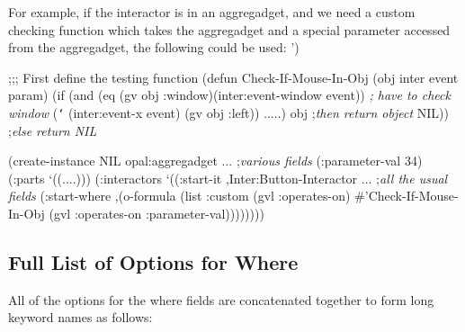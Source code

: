 For example, if the interactor is in an aggregadget, and we need a
custom checking function which takes the aggregadget and a special parameter
accessed from the aggregadget, the following could be used:
')
\begin{programexample}

;;; First define the testing function
(defun Check-If-Mouse-In-Obj (obj inter event param)
  (if (and (eq (gv obj :window)(inter:event-window event))   {\it ; have to check window}
	   ({\tt\char`\>} (inter:event-x event) (gv obj :left))
	   .....)
      obj  ;{\it then return object}
      NIL))  ;{\it else return NIL}

(create-instance NIL opal:aggregadget
   ... ;{\it various fields}
  (:parameter-val 34)
  (:parts `((....)))
  (:interactors
   `((:start-it ,Inter:Button-Interactor
	 ... ;{\it all the usual fields}
	 (:start-where
	  ,(o-formula (list :custom (gvl :operates-on)
			    \#'Check-If-Mouse-In-Obj
			    (gvl :operates-on :parameter-val))))))))
\end{programexample}


\subsection{Full List of Options for Where}
All of the options for the where fields are concatenated together to form
long keyword names as follows:

